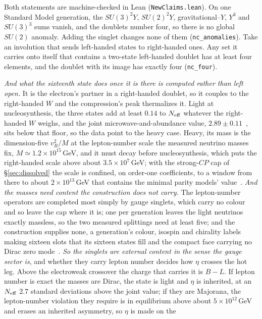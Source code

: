 \documentclass[11pt,a4paper]{article}
\theoremstyle{plain}
\theoremstyle{definition}
\begin{document}
Both statements are machine-checked in Lean (\texttt{NewClaims.lean}). On one Standard Model generation, the $SU(3)^{2}Y$, $SU(2)^{2}Y$, gravitational--$Y$, $Y^{3}$ and $SU(3)^{3}$ sums vanish, and the doublets number four, so there is no global $SU(2)$ anomaly. Adding the singlet changes none of them (\texttt{nc\_anomalies}). Take an involution that sends left-handed states to right-handed ones. Any set it carries onto itself that contains a two-state left-handed doublet has at least four elements, and the doublet with its image has exactly four (\texttt{nc\_four}).

\emph{And what the sixteenth state does once it is there is computed rather than left open.} It is the
electron's partner in a right-handed doublet, so it couples to the right-handed $W$ and the compression's peak
thermalizes it. Light at nucleosynthesis, the three states add at least $0.14$ to $N_{\rm eff}$ whatever the
right-handed $W$ weighs, and the joint microwave-and-abundance value, $2.89\pm0.11$~\cite{ACTDR6ext}, sits below
that floor, so the data point to the heavy case. Heavy, its mass is the dimension-five $v_R^{2}/M$ at the
lepton-number scale the measured neutrino masses fix, $M\simeq1.2\times10^{15}$\,GeV, and it must decay before
nucleosynthesis, which puts the right-handed scale above about $3.5\times10^{7}$\,GeV; with the strong-$CP$ cap
of \S\ref{sec:dissolved} the scale is confined, on order-one coefficients, to a window from there to about
$2\times10^{13}$\,GeV that contains the minimal parity models' value~\cite{JanzenCRcosmology,JanzenMatter}.
\emph{And the masses need content the construction does not carry.} The lepton-number operators are completed
most simply by gauge singlets, which carry no colour and so leave the cap where it is; one per generation leaves
the light neutrinos exactly massless, so the two measured splittings need at least five; and the construction
supplies none, a generation's colour, isospin and chirality labels making sixteen slots that its sixteen states
fill and the compact face carrying no Dirac zero mode~\cite{JanzenMatter,JanzenCRcosmology}. \emph{So the
singlets are external content in the sense the gauge sector is}, and whether they carry lepton number decides how
$\eta$ crosses the hot leg. Above the electroweak crossover the charge that carries it is $B-L$. If lepton number
is exact the masses are Dirac, the state is light and $\eta$ is inherited, at an $N_{\rm eff}$ $2.7$ standard
deviations above the joint value; if they are Majorana, the lepton-number violation they require is in
equilibrium above about $5\times10^{12}$\,GeV and erases an inherited asymmetry, so $\eta$ is made on the
\end{document}
